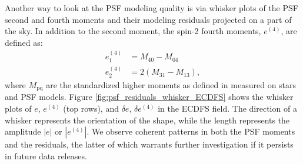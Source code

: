 Another way to look at the \gls{PSF} modeling quality is via whisker plots of the \gls{PSF} second and fourth moments and their modeling residuals projected on a part of the sky.
In addition to the second moment, the spin-2 fourth moments, $e^{(4)}$, are defined as:
\begin{align*}
e^{(4)}_1 &= M_{\text{40}} - M_{\text{04}} \\
e^{(4)}_2 &= 2\left(M_{\text{31}} - M_{\text{13}}\right),
\end{align*}
where $M_{\text{pq}}$ are the standardized higher moments as defined in \cite{2023MNRAS.520.2328Z} measured on stars and PSF models.
Figure \ref{fig:psf_residuals_whisker_ECDFS} shows
the whisker plots of $e$, $e^{(4)}$ (top rows), and $\delta e$, $\delta e^{(4)}$
in the \gls{ECDFS} field. 
The direction of a whisker represents the orientation of the \gls{shape}, while the length represents the amplitude $|e|$ or $|e^{(4)}|$.
We observe coherent patterns in both the \gls{PSF} moments and the residuals, the latter of which warrants further investigation if it persists in future data releases.
